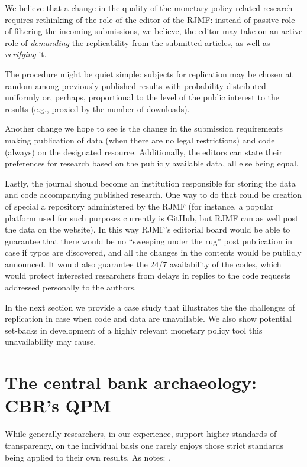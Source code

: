 \documentclass[12pt]{article}
\begin{document}
We believe that a change in the quality of the monetary policy related research requires rethinking of the role of the editor of the RJMF: instead of passive role of filtering the incoming submissions, we believe, the editor may take on an active role of {\it demanding } the replicability from the submitted articles, as well as {\it verifying} it.  

The procedure might be quiet simple: subjects for replication may be chosen at random among previously published results with probability distributed uniformly or, perhaps, proportional to the level of the public interest to the results (e.g., proxied by the number of downloads). 

Another change we hope to see is the change in the submission requirements making publication of data (when there are no legal restrictions) and code (always) on the designated resource. Additionally, the editors can state their preferences for research based on the publicly available data, all else being equal. 

Lastly, the journal should become an institution responsible for storing the data and code accompanying published research. One way to do that could be creation of special a repository administered by the RJMF (for instance, a popular platform used for such purposes currently is GitHub, but RJMF can as well post the data on the website).  In this way RJMF's editorial board would be able to guarantee that there would be no ``sweeping under the rug'' post publication in case if typos are discovered, and all the changes in the contents would be publicly announced. It would also guarantee the 24/7 availability of the codes, which would protect interested researchers from delays in replies to the code requests addressed personally to the authors.


In the next section we provide a case study that illustrates the the challenges of replication in case when code and data are unavailable. We also show potential set-backs in development of a highly relevant monetary policy tool this unavailability may cause. 


\section{The central bank archaeology: CBR's QPM}
\label{sec:ecxarche}

While generally researchers, in our experience, support higher standards of transparency, on the individual basis one rarely enjoys those strict standards being applied to their own results. As \cite{hamermesh2007replication} notes:
.
\end{document}

